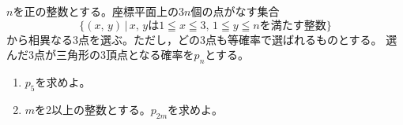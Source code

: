 \documentclass[../../main.tex]{subfiles}
\begin{document}
$n$を正の整数とする。座標平面上の$3n$個の点がなす集合
\[ \{ (x, \, y) \, | \, x, \, y \text{は}
1\leqq x \leqq3, \, 1\leqq y \leqq n \text{を満たす整数} \} \]
から相異なる3点を選ぶ。ただし，どの3点も等確率で選ばれるものとする。
選んだ3点が三角形の3頂点となる確率を$p_n$とする。
\begin{enumerate}
  \item$p_5$を求めよ。
  \item$m$を2以上の整数とする。$p_{2m}$を求めよ。
\end{enumerate}
\end{document}

